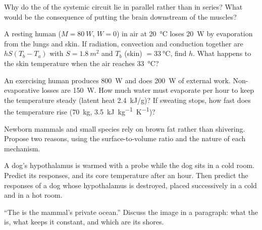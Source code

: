 \begin{exercise}[$\star\star$]\label{exo:b1:mammal-organization:7}
Why do the  of the systemic circuit lie in parallel rather than
in series? What would be the consequence of putting the brain
downstream of the muscles?
\end{exercise}

\begin{exercise}[$\star\star$]\label{exo:b1:mammal-organization:8}
A resting human ($M = \qty{80}{W}$, $W = 0$) in air at
\qty{20}{\celsius} loses \qty{20}{W} by evaporation from the lungs and
skin. If radiation, convection and conduction together are
$hS(T_b - T_a)$ with $S = \qty{1.8}{m^2}$ and $T_b$ (skin) $=
\qty{33}{\celsius}$, find $h$. What happens to the skin temperature
when the air reaches \qty{33}{\celsius}?
\end{exercise}

\begin{exercise}[$\star\star$]\label{exo:b1:mammal-organization:9}
An exercising human produces \qty{800}{W} and does \qty{200}{W} of
external work. Non-evaporative losses are \qty{150}{W}. How much water
must evaporate per hour to keep the temperature steady (latent heat
\qty{2.4}{kJ/g})? If sweating stops, how fast does the temperature
rise (\qty{70}{kg}, \qty{3.5}{kJ.kg^{-1}.K^{-1}})?
\end{exercise}

\begin{exercise}[$\star\star\star$]\label{exo:b1:mammal-organization:10}
Newborn mammals and small species rely on brown fat rather than
shivering. Propose two reasons, using the surface-to-volume ratio and
the nature of each mechanism.
\end{exercise}

\begin{exercise}[$\star\star\star$]\label{exo:b1:mammal-organization:11}
A dog's hypothalamus is warmed with a probe while the dog sits in a
cold room. Predict its responses, and its core temperature after an
hour. Then predict the responses of a dog whose hypothalamus is
destroyed, placed successively in a cold and in a hot room.
\end{exercise}

\begin{exercise}[$\star\star\star$]\label{exo:b1:mammal-organization:12}
``The  is the mammal's private ocean.'' Discuss the
image in a paragraph: what the  is, what keeps it
constant, and which  are its shores.
\end{exercise}

